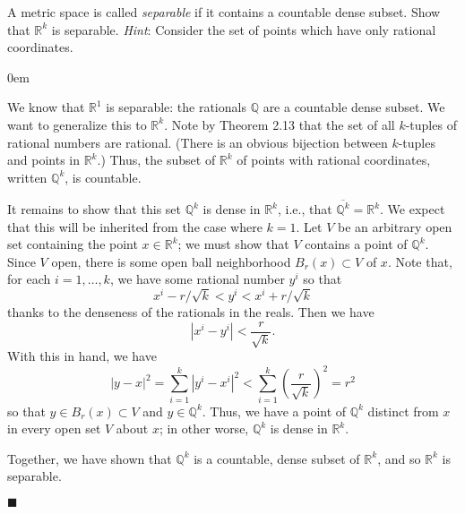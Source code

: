 \documentclass[12pt]{article}
\renewcommand{\qed}{\hfill$\blacksquare$}
\renewenvironment{proof}{\begin{addmargin}[1em]{0em}\begin{newproof}}{\end{newproof}\end{addmargin}\qed}
\newenvironment{problem}[2][Exercise]{\begin{trivlist}
\item[\hskip \labelsep {\bfseries #1}\hskip \labelsep {\bfseries #2.}]}{\end{trivlist}}
\begin{document}
\begin{problem}{2.22}
A metric space is called \textit{separable} if it contains a countable dense subset. Show that $\mathbb{R}^k$ is separable. \textit{Hint}: Consider the set of points which have only rational coordinates.
\end{problem}
\begin{proof}
We know that $\mathbb{R}^1$ is separable: the rationals $\mathbb{Q}$ are a countable dense subset. We want to generalize this to $\mathbb{R}^k$. Note by Theorem 2.13 that the set of all $k$-tuples of rational numbers are rational. (There is an obvious bijection between $k$-tuples and points in $\mathbb{R}^k$.) Thus, the subset of $\mathbb{R}^k$ of points with rational coordinates, written $\mathbb{Q}^k$, is countable.

It remains to show that this set $\mathbb{Q}^k$ is dense in $\mathbb{R}^k$, i.e., that $\overline{\mathbb{Q}^k} = \mathbb{R}^k$. We expect that this will be inherited from the case where $k=1$. Let $V$ be an arbitrary open set containing the point $x \in \mathbb{R}^k$; we must show that $V$ contains a point of $\mathbb{Q}^k$. Since $V$ open, there is some open ball neighborhood $B_r\left(x\right) \subset V$ of $x$. Note that, for each $i=1,\ldots,k$, we have some rational number $y^i$ so that $$ x^i - r/\sqrt{k} < y^i < x^i + r/\sqrt{k} $$ thanks to the denseness of the rationals in the reals. Then we have $$ \left| x^i - y^i \right| < \frac{r}{\sqrt{k}}. $$ With this in hand, we have $$ \left|y-x\right|^2 = \sum_{i=1}^k \left|y^i - x^i\right|^2 < \sum_{i=1}^k \left(\frac{r}{\sqrt{k}}\right)^2 = r^2 $$ so that $y \in B_r\left(x\right) \subset V$ and $y \in \mathbb{Q}^k$. Thus, we have a point of $\mathbb{Q}^k$ distinct from $x$ in every open set $V$ about $x$; in other worse, $\mathbb{Q}^k$ is dense in $\mathbb{R}^k$.

Together, we have shown that $\mathbb{Q}^k$ is a countable, dense subset of $\mathbb{R}^k$, and so $\mathbb{R}^k$ is separable.
\end{proof}
\end{document}
